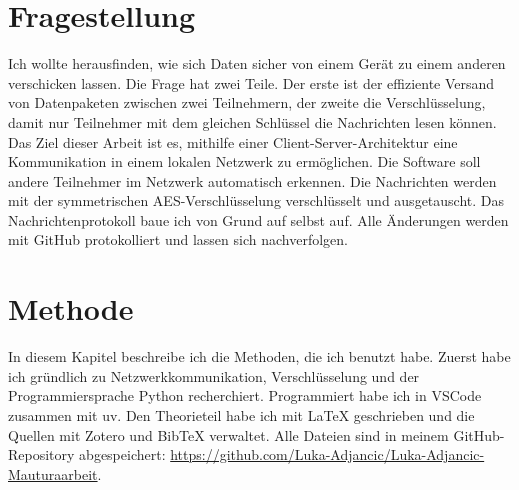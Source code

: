 \section{Fragestellung}
Ich wollte herausfinden, wie sich Daten sicher von einem Gerät zu einem anderen verschicken lassen. Die Frage hat zwei Teile. Der erste ist der effiziente Versand von Datenpaketen zwischen zwei Teilnehmern, der zweite die Verschlüsselung, damit nur Teilnehmer mit dem gleichen Schlüssel die Nachrichten lesen können.
Das Ziel dieser Arbeit ist es, mithilfe einer Client-Server-Architektur eine Kommunikation in einem lokalen Netzwerk zu ermöglichen. Die Software soll andere Teilnehmer im Netzwerk automatisch erkennen. Die Nachrichten werden mit der symmetrischen AES-Verschlüsselung verschlüsselt und ausgetauscht. Das Nachrichtenprotokoll baue ich von Grund auf selbst auf. Alle Änderungen werden mit GitHub protokolliert und lassen sich nachverfolgen.
\section{Methode}
In diesem Kapitel beschreibe ich die Methoden, die ich benutzt habe. Zuerst habe ich gründlich zu Netzwerkkommunikation, Verschlüsselung und der Programmiersprache Python recherchiert. Programmiert habe ich in VSCode zusammen mit uv.\citep{AstralshUv2026} Den Theorieteil habe ich mit \LaTeX{} geschrieben und die Quellen mit Zotero und BibTeX verwaltet.\citep{BetterBibTeXZotero} Alle Dateien sind in meinem GitHub-Repository abgespeichert: \url{https://github.com/Luka-Adjancic/Luka-Adjancic-Mauturaarbeit}.